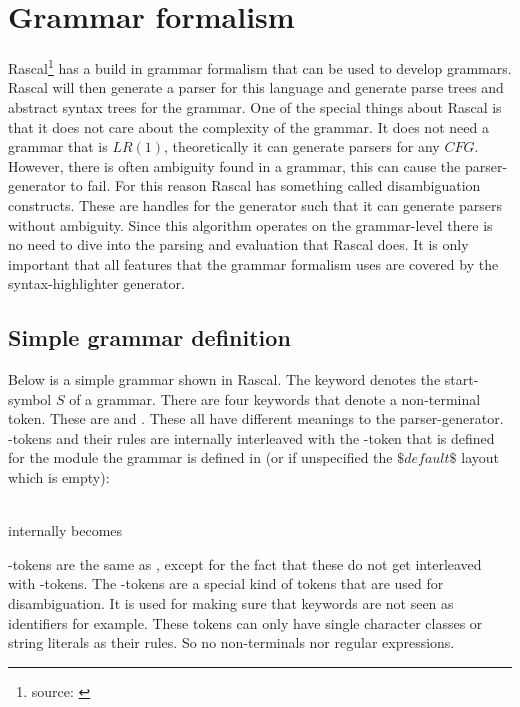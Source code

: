 \section{Grammar formalism} \label{sec:RascalGrammar}
Rascal\footnote{source: \cite{website:RascalSyntax}} has a build in grammar formalism that can be used to develop grammars. Rascal will then generate a parser for this language and generate parse trees and abstract syntax trees for the grammar. One of the special things about Rascal is that it does not care about the complexity of the grammar. It does not need a grammar that is $LR(1)$, theoretically it can generate parsers for any $CFG$. However, there is often ambiguity found in a grammar, this can cause the parser-generator to fail. For this reason Rascal has something called disambiguation constructs. These are handles for the generator such that it can generate parsers without ambiguity. Since this algorithm operates on the grammar-level there is no need to dive into the parsing and evaluation that Rascal does. It is only important that all features that the grammar formalism uses are covered by the syntax-highlighter generator.

\subsection{Simple grammar definition}
Below is a simple grammar shown in Rascal. The keyword  denotes the start-symbol $S$ of a grammar. There are four keywords that denote a non-terminal token. These are  and . These all have different meanings to the parser-generator. -tokens and their rules are internally interleaved with the -token that is defined for the module the grammar is defined in (or if unspecified the $\$default\$$ layout which is empty):
\begin{center}
  
\\internally becomes
\\ 
\end{center} 
-tokens are the same as , except for the fact that these do not get interleaved with -tokens. The -tokens are a special kind of tokens that are used for disambiguation. It is used for making sure that keywords are not seen as identifiers for example. These tokens can only have single character classes or string literals as their rules. So no non-terminals nor regular expressions.


